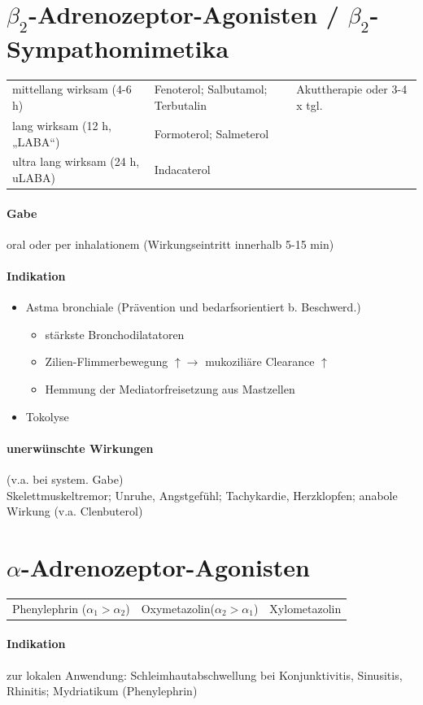 \documentclass[10pt,a4paper]{report}
\begin{document}
\section{$\beta_2$-Adrenozeptor-Agonisten / $\beta_2$-Sympathomimetika }
\begin{tabularx}{\textwidth}{XXX}
mittellang wirksam (4-6 h)& Fenoterol; Salbutamol; Terbutalin&Akuttherapie oder 3-4 x tgl.\\
lang wirksam (12 h, „LABA“)&Formoterol; Salmeterol&\\ 
ultra lang wirksam (24 h, uLABA)&Indacaterol\\
\end{tabularx}
\paragraph{Gabe} oral oder per inhalationem (Wirkungseintritt innerhalb 5-15 min) 
\paragraph{Indikation}
\begin{itemize}
	\item Astma bronchiale (Prävention und bedarfsorientiert b. Beschwerd.)
	\begin{itemize}
		\item stärkste Bronchodilatatoren
		\item Zilien-Flimmerbewegung $\uparrow \rightarrow$ mukoziliäre Clearance $\uparrow$
		\item Hemmung der Mediatorfreisetzung aus Mastzellen
	\end{itemize}		
	\item Tokolyse
\end{itemize}
\paragraph{unerwünschte Wirkungen}(v.a. bei system. Gabe)\\
Skelettmuskeltremor; Unruhe, Angstgefühl; Tachykardie, Herzklopfen; anabole Wirkung (v.a. Clenbuterol)
\section{$\alpha$-Adrenozeptor-Agonisten}
\begin{tabularx}{\textwidth}{XXX}
Phenylephrin  ($\alpha_1>\alpha_2$)& Oxymetazolin($\alpha_2>\alpha_1$)& Xylometazolin
\end{tabularx}
\paragraph{Indikation}  zur lokalen Anwendung: 	Schleimhautabschwellung bei Konjunktivitis, Sinusitis, Rhinitis; Mydriatikum (Phenylephrin)
\end{document}
